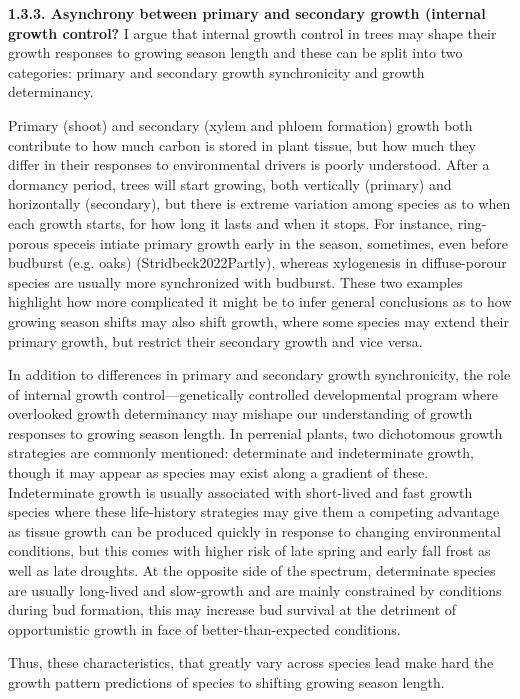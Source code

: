 \documentclass{article}
\begin{document}
\textbf{1.3.3. Asynchrony between primary and secondary growth (internal growth control?}
I argue that internal growth control in trees may shape their growth responses to growing season length and these can be split into two categories: primary and secondary growth synchronicity and growth determinancy. 

Primary (shoot) and secondary (xylem and phloem formation) growth both contribute to how much carbon is stored in plant tissue, but how much they differ in their responses to environmental drivers is poorly understood. After a dormancy period, trees will start growing, both vertically (primary) and horizontally (secondary), but there is extreme variation among species as to when each growth starts, for how long it lasts and when it stops. For instance, ring-porous speceis intiate primary growth early in the season, sometimes, even before budburst (e.g. oaks) (Stridbeck2022Partly), whereas xylogenesis in diffuse-porour species are usually more synchronized with budburst. These two examples highlight how more complicated it might be to infer general conclusions as to how growing season shifts may also shift growth, where some species may extend their primary growth, but restrict their secondary growth and vice versa.

In addition to differences in primary and secondary growth synchronicity, the role of internal growth control---genetically controlled developmental program where overlooked growth determinancy may mishape our understanding of growth responses to growing season length. In perrenial plants, two dichotomous growth strategies are commonly mentioned: determinate and indeterminate growth, though it may appear as species may exist along a gradient of these. Indeterminate growth is usually associated with short-lived and fast growth species where these life-history strategies may give them a competing advantage as tissue growth can be produced quickly in response to changing environmental conditions, but this comes with higher risk of late spring and early fall frost as well as late droughts. At the opposite side of the spectrum, determinate species are usually long-lived and slow-growth and are mainly constrained by conditions during bud formation, this may increase bud survival at the detriment of opportunistic growth in face of better-than-expected conditions. 

Thus, these characteristics, that greatly vary across species lead make hard the growth pattern predictions of species to shifting growing season length.%
\end{document}
